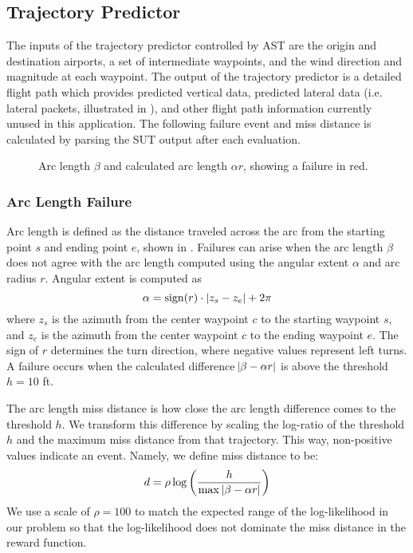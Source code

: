 \subsection{Trajectory Predictor}
The inputs of the trajectory predictor controlled by AST are the origin and destination airports, a set of intermediate waypoints, and the wind direction and magnitude at each waypoint.
The output of the trajectory predictor is a detailed flight path which provides predicted vertical data, predicted lateral data (i.e. lateral packets, illustrated in ), and other flight path information currently unused in this application.
The following failure event and miss distance is calculated by parsing the SUT output after each evaluation.




\begin{figure}[!hb]
\centering
\resizebox{0.6\columnwidth}{!}{}
\caption{Arc length $\beta$ and calculated arc length $\alpha r$, showing a failure in red.}
\label{fig:arc_length}
\end{figure}

\subsubsection{Arc Length Failure}
Arc length is defined as the distance traveled across the arc from the starting point $s$ and ending point $e$, shown in .
Failures can arise when the arc length $\beta$ does not agree with the arc length computed using the angular extent $\alpha$ and arc radius $r$.
Angular extent is computed as
\begin{equation}
  \alpha = \operatorname{sign}(r) \cdot |z_s - z_e| + 2\pi
\end{equation}
where $z_s$ is the azimuth from the center waypoint $c$ to the starting waypoint $s$, and $z_e$ is the azimuth from the center waypoint $c$ to the ending waypoint $e$.
The sign of $r$ determines the turn direction, where negative values represent left turns.
A failure occurs when the calculated difference $\abs{\beta - \alpha r}$ is above the threshold $h=10$ \si{ft}. 



The arc length miss distance is how close the arc length difference comes to the threshold $h$.
We transform this difference by scaling the log-ratio of the threshold $h$ and the maximum miss distance from that trajectory.
This way, non-positive values indicate an event.
Namely, we define miss distance to be:
\begin{equation} \label{eq:miss}
  d = \rho\log\left(\frac{h}{\max\,\abs{\beta - \alpha r}}\right)
\end{equation}
We use a scale of $\rho=100$ to match the expected range of the log-likelihood in our problem so that the log-likelihood does not dominate the miss distance in the reward function.  

